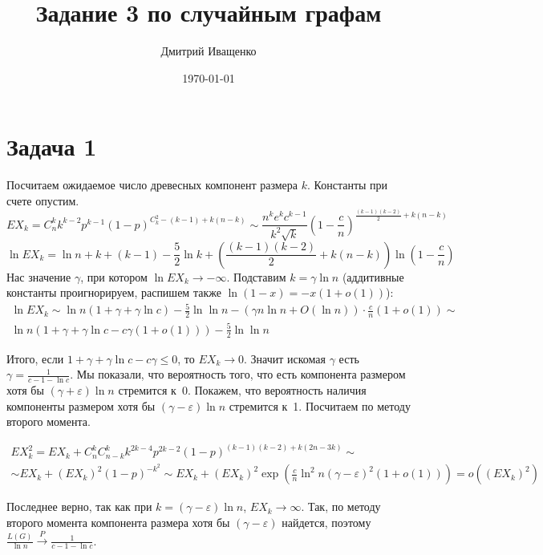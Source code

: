 \documentclass{article}
\theoremstyle{definition}
\theoremstyle{remark}
\renewcommand{\le}{\leqslant}
\newcommand{\eps}{\varepsilon}
\begin{document}
\title{Задание 3 по случайным графам}
\author{Дмитрий Иващенко}
\date{\today}
\maketitle

\section*{Задача 1}

Посчитаем ожидаемое число древесных компонент размера $k$. Константы при счете опустим.
\begin{equation*}
	EX_k = C_n^k k^{k-2} p^{k-1} (1-p)^{C_k^2 - (k-1) + k(n-k)} \sim \frac{n^k e^k
	c^{k-1}}{k^2\sqrt{k}} \left(1 - \frac{c}{n}\right)^{\frac{(k-1)(k-2)}{2}+k(n-k)}
\end{equation*}
\begin{equation*}
	\ln EX_k = \ln n + k + (k - 1) - \frac{5}{2} \ln k + \left(\frac{(k-1)(k-2)}{2} + k(n-k)\right)
	\ln \left(1 - \frac{c}{n}\right)
\end{equation*}
Нас значение $\gamma$, при котором $\ln EX_k \rightarrow -\infty$. Подставим $k = \gamma \ln n$
(аддитивные константы проигнорируем, распишем также $\ln(1 - x) = -x(1 + o(1))$):
\begin{multline*}
	\ln EX_k \sim \ln n (1 + \gamma + \gamma \ln c) -\frac{5}{2} \ln\ln n - (\gamma n \ln n + O(\ln n))
	\cdot \frac{c}{n}(1 + o(1)) \sim\\
	\ln n(1 + \gamma + \gamma \ln c - c\gamma(1 + o(1))) - \frac{5}{2} \ln\ln n
\end{multline*}

Итого, если $1 + \gamma + \gamma \ln c - c\gamma \le 0$, то $EX_k \rightarrow 0$. Значит искомая
$\gamma$ есть $\gamma = \frac{1}{c - 1 - \ln c}$. Мы показали, что вероятность того, что есть
компонента размером хотя бы $(\gamma + \eps) \ln n$ стремится к~0. Покажем, что вероятность наличия
компоненты размером хотя бы $(\gamma - \eps) \ln n$ стремится к~1. Посчитаем по методу второго
момента.

\begin{multline*}
EX_k^2 = EX_k + C_n^k C_{n-k}^k k^{2k-4} p^{2k-2} (1-p)^{(k-1)(k-2) + k(2n-3k)} \sim\\
	\sim EX_k + (EX_k)^2 (1-p)^{-k^2} \sim EX_k + (EX_k)^2 \exp\left( \frac{c}{n} \ln^2 n (\gamma -
	\eps)^2 (1 + o(1))\right) = o((EX_k)^2)
\end{multline*}

Последнее верно, так как при $k = (\gamma - \eps) \ln n$, $EX_k \rightarrow \infty$. Так, по методу
второго момента компонента размера хотя бы $(\gamma - \eps)$ найдется, поэтому $\frac{L(G)}{\ln n}
\overset{P}\rightarrow \frac{1}{c - 1 - \ln c}$.
\end{document}
